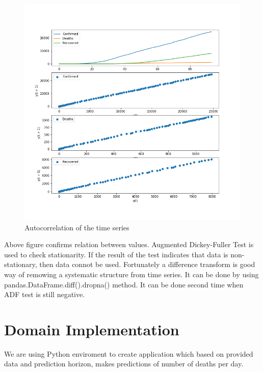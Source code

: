 \documentclass[conference]{IEEEtran}
\begin{document}
\begin{figure}[h!]
    \includegraphics[width=\linewidth]{images/Correlation_lag.png}
    \caption{Autocorrelation of the time series}
    \label{fig:AutoCorrelation}
\end{figure}

Above figure confirms relation between values. Augmented Dickey-Fuller Test is used to check stationarity. If the result of the test indicates that data is non-stationary,
then data connot be used. Fortunately a difference transform is good way of remowing a systematic structure from time series. It can be done by using
 pandas.DataFrame.diff().dropna() method. It can be done second time when ADF test is still negative.


\section{Domain Implementation}
We are using Python enviroment to create application which based on provided data and prediction horizon, makes predictions of number of deaths per day.
\end{document}
